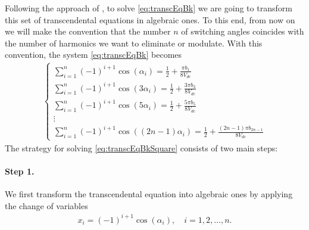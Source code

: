 \documentclass[a4paper]{article}
\numberwithin{equation}{section}
\begin{document}
Following the approach of \cite{janabi2018real,janabi2019generalized}, to solve \eqref{eq:transcEqBk} we are going to transform this set of transcendental equations in algebraic ones. To this end, from now on we will make the convention that the number $n$ of switching angles coincides with the number of harmonics we want to eliminate or modulate. With this convention, the system \eqref{eq:transcEqBk} becomes
\begin{align}\label{eq:transcEqBkSquare}
	\begin{cases}
		\displaystyle \sum_{i=1}^n(-1)^{i+1}\cos(\alpha_i) = \frac 12 +\frac{\pi b_1}{8V_{dc}}
		\\[12pt]
		\displaystyle \sum_{i=1}^n(-1)^{i+1}\cos(3\alpha_i) = \frac 12 +\frac{3\pi b_3}{8V_{dc}}
		\\[12pt]
		\displaystyle \sum_{i=1}^n(-1)^{i+1}\cos(5\alpha_i) = \frac 12 +\frac{5\pi b_5}{8V_{dc}}
		\\
		\vdots 
		\\
		\displaystyle \sum_{i=1}^n(-1)^{i+1}\cos((2n-1)\alpha_i) = \frac 12 +\frac{(2n-1)\pi b_{2n-1}}{8V_{dc}} 
	\end{cases}	
\end{align}
The strategy for solving \eqref{eq:transcEqBkSquare} consists of two main steps:
\paragraph{Step 1.}	We first transform the transcendental equation into algebraic ones by applying the change of variables
\begin{align}\label{eq:changeVariables}
	x_i = (-1)^{i+1}\cos(\alpha_i), \quad i=1,2,\ldots,n.
\end{align}
\end{document}

